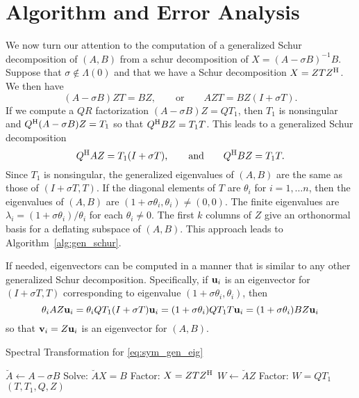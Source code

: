 \documentclass[12pt]{article}
\def\eqand{\qquad\mbox{and}\qquad}
\def\vec#1{{\bf #1}}
\def\H{{\rm H}}
\begin{document}
\section{Algorithm and Error Analysis}
\label{sec:algor-error-analys}

We now turn our attention to the computation of a generalized Schur
decomposition of $(A,B)$ from a schur decomposition of
$X = (A-\sigma B)^{-1} B$.  Suppose that $\sigma \notin \Lambda(0)$
and that we have a Schur decomposition $X = ZTZ^\H$.  We then have
\begin{equation*}
  (A -\sigma B) Z T = B Z,\qquad\mbox{or}\qquad
  A Z T = B Z (I +\sigma T).
\end{equation*}
If we compute a $QR$ factorization $(A -\sigma B)Z = QT_1$, then $T_1$
is nonsingular and $Q^\H (A-\sigma B) Z = T_1$ so that
$Q^\H BZ = T_1 T$.  This leads to a generalized Schur decomposition
\begin{equation*}
  Q^\H A Z = T_1(I+\sigma T),\eqand Q^\H BZ = T_1 T.
\end{equation*}
Since $T_1$ is nonsingular, the generalized eigenvalues of $(A,B)$ are
the same as those of $(I+\sigma T, T)$.  If the diagonal elements of
$T$ are $\theta_i$ for $i=1,\ldots n$, then the eigenvalues of $(A,B)$
are $(1+\sigma\theta_i, \theta_i)\neq (0,0)$.  The finite eigenvalues
are $\lambda_i = (1+\sigma \theta_i)/\theta_i$ for each
$\theta_i\neq 0$.  The first $k$ columns of $Z$ give an orthonormal
basis for a deflating subspace of $(A,B)$.  This approach leads to
Algorithm~\ref{alg:gen_schur}.

If needed, eigenvectors can be computed in a manner that is similar to
any other generalized Schur decomposition.  Specifically, if
$\vec{u}_i$ is an eigenvector for $(I+\sigma T, T)$ corresponding to
eigenvalue $(1+\sigma\theta_i, \theta_i)$, then
\begin{equation*}
  \theta_i A Z \vec{u}_i 
  = \theta_i QT_1(I+\sigma T) \vec{u}_i
  = (1+\sigma \theta_i) Q T_1 T \vec{u}_i
  = (1+\sigma \theta_i) B Z \vec{u}_i
\end{equation*}
so that $\vec{v}_i = Z \vec{u}_i$ is an eigenvector for $(A,B)$.  

\begin{algorithm}
\caption{Spectral Transformation for \eqref{eq:sym_gen_eig}}
\label{alg:gen_schur}
\begin{algorithmic}
\State $\breve{A} \gets A - \sigma B$
\State Solve: $\breve{A}X = B$
\State Factor: $X = Z T Z^{\H}$
\State $W \gets \breve{A}Z$
\State Factor: $W = Q T_1$
\State \Return $(T, T_1, Q, Z)$
\EndFunction
\end{algorithmic}
\end{algorithm}
\end{document}
